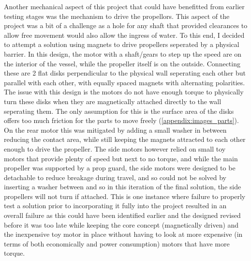 \documentclass[11pt,a4paper,titlepage]{report}
\begin{document}
	Another mechanical aspect of this project that could have benefitted from earlier testing stages was the mechanism to drive the propellors. This aspect of the project was a bit of a challenge as a hole for any shaft that provided clearances to allow free movement would also allow the ingress of water. To this end, I decided to attempt a solution using magnets to drive propellers seperated by a physical barrier. In this design, the motor with a shaft/gears to step up the speed are on the interior of the vessel, while the propeller itself is on the outside. Connecting these are 2 flat disks perpendicular to the physical wall seperating each other but parallel with each other, with equally spaced magnets with alternating polarities. The issue with this design is the motors do not have enough torque to physically turn these disks when they are magnetically attached directly to the wall seperating them. The only assumption for this is the surface area of the disks offers too much friction for the parts to move freely (\ref{appendix:images_parts}). On the rear motor this was mitigated by adding a small washer in between reducing the contact area, while still keeping the magnets attracted to each other enough to drive the propeller. The side motors however relied on small toy motors that provide plenty of speed but next to no torque, and while the main propeller was supported by a prop guard, the side motors were designed to be detachable to reduce breakage during travel, and so could not be solved by inserting a washer between and so in this iteration of the final solution, the side propellers will not turn if attached. This is one instance where failure to properly test a solution prior to incorporating it fully into the project resulted in an overall failure as this could have been identified earlier and the designed revised before it was too late while keeping the core concept (magnetically driven) and the inexpensive toy motor in place without having to look at more expensive (in terms of both economically and power consumption) motors that have more torque. 
	
\end{document}
